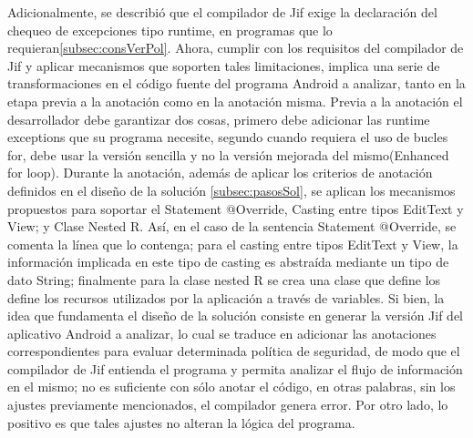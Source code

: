 % 
Adicionalmente, se describió que el compilador de Jif exige la declaración del
chequeo de excepciones tipo runtime, en programas que lo
requieran\ref{subsec:consVerPol}. Ahora, cumplir con los requisitos del
compilador de Jif y aplicar mecanismos que soporten tales limitaciones, implica
una serie de transformaciones en el código fuente del programa Android a
analizar, tanto en la etapa previa a la anotación como en la anotación
misma.\newline
Previa a la anotación el desarrollador debe garantizar dos cosas, primero debe
adicionar las runtime exceptions que su programa necesite, segundo cuando
requiera el uso de bucles for, debe usar la versión sencilla y no la versión
mejorada del mismo(Enhanced for loop).\newline 
Durante la anotación, además de aplicar los criterios de anotación definidos en
el diseño de la solución \ref{subsec:pasosSol}, se aplican los mecanismos
propuestos para soportar el Statement @Override, Casting entre tipos EditText y
View; y Clase Nested R. Así, en el caso de  la sentencia Statement @Override, se
comenta la línea que lo contenga; para el casting entre tipos EditText y View,
la información implicada en este tipo de casting es abstraída mediante un tipo
de dato String; finalmente para la clase nested R se crea una clase que define
los define los recursos utilizados por la aplicación a través de
variables.\newline 
Si bien, la idea que fundamenta el diseño de la solución consiste en generar la
versión Jif del aplicativo Android a analizar, lo cual se traduce en adicionar
las anotaciones correspondientes para evaluar determinada política de seguridad,
de modo que el compilador de Jif entienda el programa y permita analizar el
flujo de información en el mismo; no es suficiente con sólo anotar el código, en
otras palabras, sin los ajustes previamente mencionados, el compilador genera
error. Por otro lado, lo positivo es que tales ajustes no alteran la lógica del
programa.


